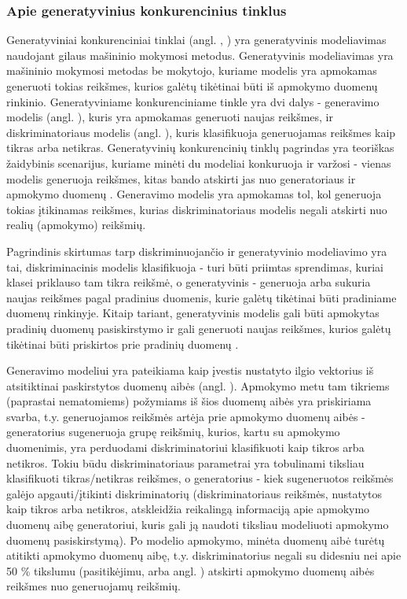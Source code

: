 \documentclass{VUMIFInfBakalaurinis}
\begin{document}
\subsubsection{Apie generatyvinius konkurencinius tinklus}
Generatyviniai konkurenciniai tinklai (angl. , ) yra generatyvinis modeliavimas naudojant gilaus 
mašininio mokymosi metodus. Generatyvinis modeliavimas yra mašininio mokymosi 
metodas be mokytojo, kuriame modelis yra apmokamas generuoti tokias reikšmes, 
kurios galėtų tikėtinai būti iš apmokymo duomenų rinkinio. Generatyviniame 
konkurenciniame tinkle yra dvi dalys - generavimo modelis (angl. 
), kuris yra apmokamas generuoti naujas reikšmes, ir 
diskriminatoriaus modelis (angl. ), kuris 
klasifikuoja generuojamas reikšmes kaip tikras arba netikras. Generatyvinių 
konkurencinių tinklų pagrindas yra teoriškas žaidybinis scenarijus, kuriame 
minėti du modeliai konkuruoja ir varžosi - vienas modelis generuoja reikšmes, 
kitas bando atskirti jas nuo generatoriaus ir apmokymo duomenų 
\cite{Goodfellow-et-al-2016}. Generavimo modelis yra apmokamas tol, kol 
generuoja tokias įtikinamas reikšmes, kurias diskriminatoriaus modelis negali 
atskirti nuo realių (apmokymo) reikšmių.

Pagrindinis skirtumas tarp diskriminuojančio ir generatyvinio modeliavimo yra 
tai, diskriminacinis modelis klasifikuoja - turi būti priimtas sprendimas, 
kuriai klasei priklauso tam tikra reikšmė, o generatyvinis - generuoja arba 
sukuria naujas reikšmes pagal pradinius duomenis, kurie galėtų tikėtinai būti 
pradiniame duomenų rinkinyje. Kitaip tariant, generatyvinis modelis gali būti 
apmokytas pradinių duomenų pasiskirstymo ir gali generuoti naujas reikšmes, 
kurios galėtų tikėtinai būti priskirtos prie pradinių duomenų \cite{Bishop07}.

Generavimo modeliui yra pateikiama kaip įvestis nustatyto ilgio vektorius iš 
atsitiktinai paskirstytos duomenų aibės (angl. ). Apmokymo metu tam tikriems (paprastai nematomiems) požymiams iš 
šios duomenų aibės yra priskiriama svarba, t.y. generuojamos reikšmės artėja 
prie apmokymo duomenų aibės - generatorius sugeneruoja grupę reikšmių, kurios, 
kartu su apmokymo duomenimis, yra perduodami diskriminatoriui klasifikuoti kaip 
tikros arba netikros. Tokiu būdu diskriminatoriaus parametrai yra tobulinami 
tiksliau klasifikuoti tikras/netikras reikšmes, o generatorius - kiek 
sugeneruotos reikšmės galėjo apgauti/įtikinti diskriminatorių (diskriminatoriaus 
reikšmės, nustatytos kaip tikros arba netikros, atskleidžia reikalingą 
informaciją apie apmokymo duomenų aibę generatoriui, kuris gali ją naudoti 
tiksliau modeliuoti apmokymo duomenų pasiskirstymą). Po modelio apmokymo, minėta 
duomenų aibė turėtų atitikti apmokymo duomenų aibę, t.y. diskriminatorius negali 
su didesniu nei apie 50 \% tikslumu (pasitikėjimu, arba angl. 
) atskirti apmokymo duomenų aibės reikšmes nuo generuojamų 
reikšmių.
\end{document}
